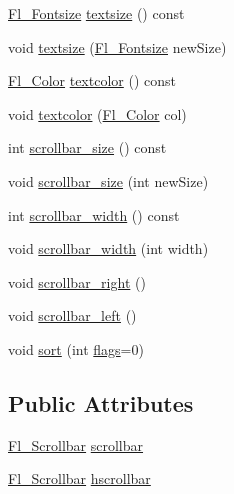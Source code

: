 \begin{DoxyCompactItemize}
\item 
\hyperlink{_enumerations_8_h_ad58927f5c691454480f7cd28362502f1}{Fl\+\_\+\+Fontsize} \hyperlink{class_fl___browser___a43889aa554fd2285991f73cc11918bda}{textsize} () const
\item 
void \hyperlink{class_fl___browser___ad6f0e70675e073dd97e02b5954675861}{textsize} (\hyperlink{_enumerations_8_h_ad58927f5c691454480f7cd28362502f1}{Fl\+\_\+\+Fontsize} new\+Size)
\item 
\hyperlink{_enumerations_8_h_a8b762953646f8abee866061f1af78a6a}{Fl\+\_\+\+Color} \hyperlink{class_fl___browser___a1a76a8e81183b02b45a669d8cfd3adeb}{textcolor} () const
\item 
void \hyperlink{class_fl___browser___ad33ff1165743695e7bb2e1d89eb75622}{textcolor} (\hyperlink{_enumerations_8_h_a8b762953646f8abee866061f1af78a6a}{Fl\+\_\+\+Color} col)
\item 
int \hyperlink{class_fl___browser___a89f6b1be07fc063bf8a8d83cb39d5fa0}{scrollbar\+\_\+size} () const
\item 
void \hyperlink{class_fl___browser___a6743b9c1513c68e82543530154cadf57}{scrollbar\+\_\+size} (int new\+Size)
\item 
int \hyperlink{class_fl___browser___a397cd7d2550ca3d87032fa1ffd3e4bbc}{scrollbar\+\_\+width} () const
\item 
void \hyperlink{class_fl___browser___a4d59d5c7d78393a7a5d5bfaa01694580}{scrollbar\+\_\+width} (int width)
\item 
void \hyperlink{class_fl___browser___a92ef1a69de96f610e2776591ee3bea06}{scrollbar\+\_\+right} ()
\item 
void \hyperlink{class_fl___browser___af6c48bc6c8bcfc43f317aa053b72ea2d}{scrollbar\+\_\+left} ()
\item 
void \hyperlink{class_fl___browser___a852d20413fc81fd0be7c63408639974e}{sort} (int \hyperlink{class_fl___widget_a5b8a508113d122b448c38045e65e4266}{flags}=0)
\end{DoxyCompactItemize}
\subsection*{Public Attributes}
\begin{DoxyCompactItemize}
\item 
\hyperlink{class_fl___scrollbar}{Fl\+\_\+\+Scrollbar} \hyperlink{class_fl___browser___ac76f28c936430d7884ac98d44ff4e3ad}{scrollbar}
\item 
\hyperlink{class_fl___scrollbar}{Fl\+\_\+\+Scrollbar} \hyperlink{class_fl___browser___a7cd58698b839837fb530814fad43c2cc}{hscrollbar}
\end{DoxyCompactItemize}
